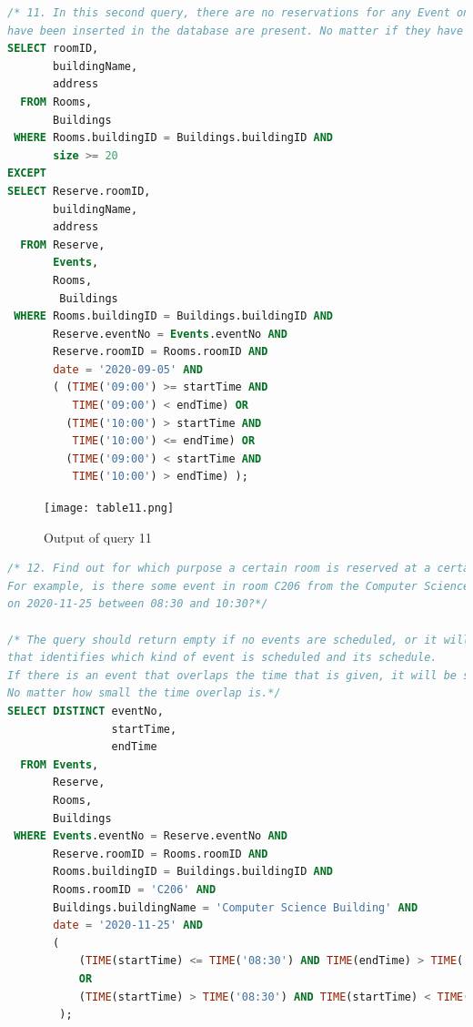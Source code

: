 \documentclass{article}
\begin{document}
\begin{lstlisting}[language=SQL]
/* 11. In this second query, there are no reservations for any Event on 2020-09-05, so all the rooms that 
have been inserted in the database are present. No matter if they have any scheduled event at some point or not.*/
SELECT roomID,
       buildingName,
       address
  FROM Rooms,
       Buildings
 WHERE Rooms.buildingID = Buildings.buildingID AND 
       size >= 20
EXCEPT
SELECT Reserve.roomID,
       buildingName,
       address
  FROM Reserve,
       Events,
       Rooms,
        Buildings
 WHERE Rooms.buildingID = Buildings.buildingID AND 
       Reserve.eventNo = Events.eventNo AND 
       Reserve.roomID = Rooms.roomID AND 
       date = '2020-09-05' AND 
       ( (TIME('09:00') >= startTime AND 
          TIME('09:00') < endTime) OR 
         (TIME('10:00') > startTime AND 
          TIME('10:00') <= endTime) OR 
         (TIME('09:00') < startTime AND 
          TIME('10:00') > endTime) );
\end{lstlisting}

\begin{figure}[!h]
	\centering
	\texttt{[image: table11.png]}
	\caption{Output of query 11}
	\label{fig:11}
\end{figure}

\begin{lstlisting}[language=SQL]
/* 12. Find out for which purpose a certain room is reserved at a certain time. 
For example, is there some event in room C206 from the Computer Science Building 
on 2020-11-25 between 08:30 and 10:30?*/

/* The query should return empty if no events are scheduled, or it will return the EventNo 
that identifies which kind of event is scheduled and its schedule.
If there is an event that overlaps the time that is given, it will be shown as well.
No matter how small the time overlap is.*/
SELECT DISTINCT eventNo,
                startTime,
                endTime
  FROM Events,
       Reserve,
       Rooms,
       Buildings
 WHERE Events.eventNo = Reserve.eventNo AND 
       Reserve.roomID = Rooms.roomID AND
       Rooms.buildingID = Buildings.buildingID AND 
       Rooms.roomID = 'C206' AND 
       Buildings.buildingName = 'Computer Science Building' AND 
       date = '2020-11-25' AND 
       (
           (TIME(startTime) <= TIME('08:30') AND TIME(endTime) > TIME('08:30') ) 
           OR 
           (TIME(startTime) > TIME('08:30') AND TIME(startTime) < TIME('10:30') )
        );
\end{lstlisting}
\end{document}
